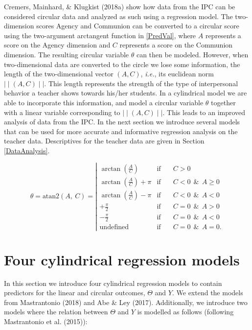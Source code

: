 \documentclass[11pt,]{article}
\begin{document}
Cremers, Mainhard, \& Klugkist (2018a) show how data from the IPC can be
considered circular data and analyzed as such using a regression model.
The two-dimension scores Agency and Communion can be converted to a
circular score using the two-argument arctangent function in
\eqref{PredVal}, where \(A\) represents a score on the Agency dimension
and \(C\) represents a score on the Communion dimension. The resulting
circular variable \(\theta\) can then be modeled. However, when
two-dimensional data are converted to the circle we lose some
information, the length of the two-dimensional vector \((A, C)\),
\emph{i.e.}, its euclidean norm \(\mid\mid (A, C) \mid\mid\). This
length represents the strength of the type of interpersonal behavior a
teacher shows towards his/her students. In a cylindrical model we are
able to incorporate this information, and model a circular variable
\(\theta\) together with a linear variable corresponding to
\(\mid\mid (A, C) \mid\mid\). This leads to an improved analysis of data
from the IPC. In the next section we introduce several models that can
be used for more accurate and informative regression analysis on the
teacher data. Descriptives for the teacher data are given in Section
\ref{DataAnalysis}.

\begin{equation}\label{PredVal}
\theta          = \text{atan2}\left(A, \: C\right)  =
\left|{\begin{array}{lcl}
                                                                       \arctan\left(\frac{A}{C}\right) & \text{if}  \quad&C > 0 \\
\arctan\left(\frac{A}{C}\right) + \pi & \text{if}  \quad& C  <  0  \:\: \&\:\: A \geq 0\\
 \arctan\left(\frac{A}{C}\right) - \pi & \text{if}  \quad&C  <  0 \:\:  \&\:\:A  < 0\\
 +\frac{\pi}{2} & \text{if}  \quad& C  =  0  \:\: \&\:\:A > 0\\
 -\frac{\pi}{2} & \text{if}  \quad& C =  0  \:\: \&\:\:A < 0\\
 \text{undefined} & \text{if} \quad& C =  0   \:\: \&\:\:A = 0.
 \end{array}}
\right.
\end{equation}

\section{Four cylindrical regression models}\label{Models}

In this section we introduce four cylindrical regression models to
contain predictors for the linear and circular outcomes, \(\Theta\) and
\(Y\). We extend the models from Mastrantonio (2018) and Abe \& Ley
(2017). Additionally, we introduce two models where the relation between
\(\Theta\) and \(Y\) is modelled as follows (following Mastrantonio et
al. (2015)):
\end{document}
